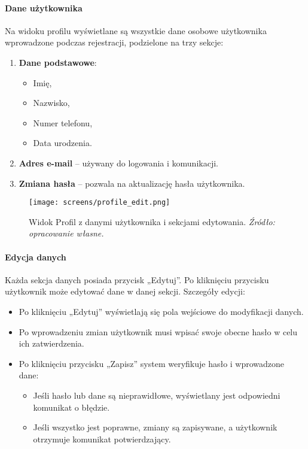 \documentclass[12pt,a4paper,oneside]{article}
\theoremstyle{definition}
\numberwithin{equation}{section}
\begin{document}
\paragraph{Dane użytkownika}
Na widoku profilu wyświetlane są wszystkie dane osobowe użytkownika wprowadzone podczas rejestracji, podzielone na trzy sekcje:
\begin{enumerate}
    \item \textbf{Dane podstawowe}:
    \begin{itemize}
        \item Imię,
        \item Nazwisko,
        \item Numer telefonu,
        \item Data urodzenia.
    \end{itemize}
    \item \textbf{Adres e-mail} – używany do logowania i komunikacji.
    \item \textbf{Zmiana hasła} – pozwala na aktualizację hasła użytkownika.
\end{enumerate}

\begin{figure}[H]
    \centering
    \texttt{[image: screens/profile\_edit.png]}
    \caption{Widok Profil z danymi użytkownika i sekcjami edytowania. \emph{Źródło: opracowanie własne.}}
    \label{fig:profile_edit}
\end{figure}

\paragraph{Edycja danych}
Każda sekcja danych posiada przycisk „Edytuj”. Po kliknięciu przycisku użytkownik może edytować dane w danej sekcji. Szczegóły edycji:
\begin{itemize}
    \item Po kliknięciu „Edytuj” wyświetlają się pola wejściowe do modyfikacji danych.
    \item Po wprowadzeniu zmian użytkownik musi wpisać swoje obecne hasło w celu ich zatwierdzenia.
    \item Po kliknięciu przycisku „Zapisz” system weryfikuje hasło i wprowadzone dane:
    \begin{itemize}
        \item Jeśli hasło lub dane są nieprawidłowe, wyświetlany jest odpowiedni komunikat o błędzie.
        \item Jeśli wszystko jest poprawne, zmiany są zapisywane, a użytkownik otrzymuje komunikat potwierdzający.
    \end{itemize}
\end{itemize}
\end{document}
